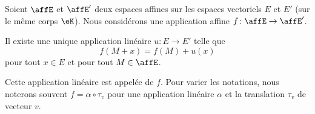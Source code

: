 \begin{lemmaDef}       \label{LEMooYJCDooOGAHkF}
    Soient \( \affE\) et \( \affE'\) deux espaces affines sur les espaces vectoriels \( E\) et \( E'\) (sur le même corps \( \eK\)). Nous considérons une application affine \( f\colon \affE\to \affE'\).

    Il existe une unique application linéaire \( u\colon E\to E'\) telle que
    \begin{equation}
        f(M+x)=f(M)+u(x)
    \end{equation}
    pour tout \( x\in E\) et pour tout \( M\in \affE\).

    Cette application linéaire est appelée  de \( f\). Pour varier les notations, nous noterons souvent \( f=\alpha\circ\tau_v\) pour une application linéaire \( \alpha\) et la translation \( \tau_v\) de vecteur \( v\).
\end{lemmaDef}

